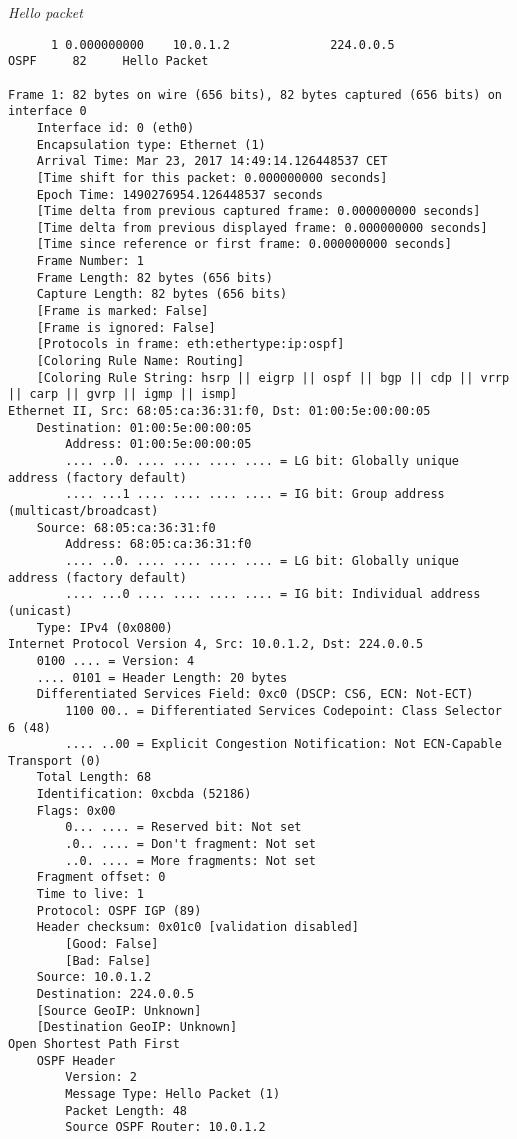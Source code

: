 
\textit{Hello packet} 
\begin{lstlisting}
      1 0.000000000    10.0.1.2              224.0.0.5             OSPF     82     Hello Packet

Frame 1: 82 bytes on wire (656 bits), 82 bytes captured (656 bits) on interface 0
    Interface id: 0 (eth0)
    Encapsulation type: Ethernet (1)
    Arrival Time: Mar 23, 2017 14:49:14.126448537 CET
    [Time shift for this packet: 0.000000000 seconds]
    Epoch Time: 1490276954.126448537 seconds
    [Time delta from previous captured frame: 0.000000000 seconds]
    [Time delta from previous displayed frame: 0.000000000 seconds]
    [Time since reference or first frame: 0.000000000 seconds]
    Frame Number: 1
    Frame Length: 82 bytes (656 bits)
    Capture Length: 82 bytes (656 bits)
    [Frame is marked: False]
    [Frame is ignored: False]
    [Protocols in frame: eth:ethertype:ip:ospf]
    [Coloring Rule Name: Routing]
    [Coloring Rule String: hsrp || eigrp || ospf || bgp || cdp || vrrp || carp || gvrp || igmp || ismp]
Ethernet II, Src: 68:05:ca:36:31:f0, Dst: 01:00:5e:00:00:05
    Destination: 01:00:5e:00:00:05
        Address: 01:00:5e:00:00:05
        .... ..0. .... .... .... .... = LG bit: Globally unique address (factory default)
        .... ...1 .... .... .... .... = IG bit: Group address (multicast/broadcast)
    Source: 68:05:ca:36:31:f0
        Address: 68:05:ca:36:31:f0
        .... ..0. .... .... .... .... = LG bit: Globally unique address (factory default)
        .... ...0 .... .... .... .... = IG bit: Individual address (unicast)
    Type: IPv4 (0x0800)
Internet Protocol Version 4, Src: 10.0.1.2, Dst: 224.0.0.5
    0100 .... = Version: 4
    .... 0101 = Header Length: 20 bytes
    Differentiated Services Field: 0xc0 (DSCP: CS6, ECN: Not-ECT)
        1100 00.. = Differentiated Services Codepoint: Class Selector 6 (48)
        .... ..00 = Explicit Congestion Notification: Not ECN-Capable Transport (0)
    Total Length: 68
    Identification: 0xcbda (52186)
    Flags: 0x00
        0... .... = Reserved bit: Not set
        .0.. .... = Don't fragment: Not set
        ..0. .... = More fragments: Not set
    Fragment offset: 0
    Time to live: 1
    Protocol: OSPF IGP (89)
    Header checksum: 0x01c0 [validation disabled]
        [Good: False]
        [Bad: False]
    Source: 10.0.1.2
    Destination: 224.0.0.5
    [Source GeoIP: Unknown]
    [Destination GeoIP: Unknown]
Open Shortest Path First
    OSPF Header
        Version: 2
        Message Type: Hello Packet (1)
        Packet Length: 48
        Source OSPF Router: 10.0.1.2

\end{lstlisting}
